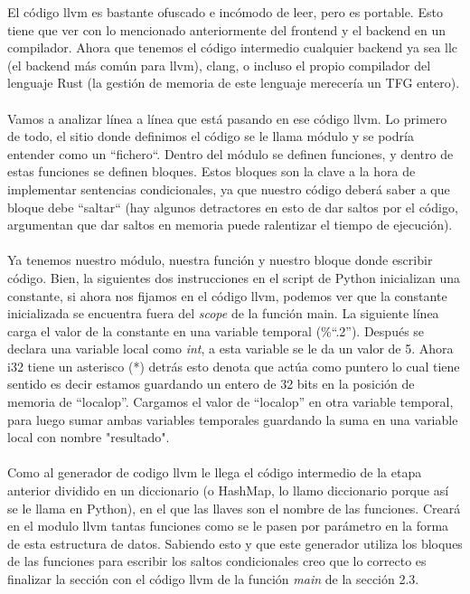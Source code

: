 El código llvm es bastante ofuscado e incómodo de leer, pero es portable. Esto tiene que ver con lo mencionado anteriormente del frontend y el backend en un compilador. Ahora que tenemos el código intermedio cualquier backend ya sea llc (el backend más común para llvm), clang, o incluso el propio compilador del lenguaje Rust (la gestión de memoria de este lenguaje merecería un TFG entero).\\\\
Vamos a analizar línea a línea que está pasando en ese código llvm. Lo primero de todo, el sitio donde definimos el código se le llama módulo y se podría entender como un ``fichero``. Dentro del módulo se definen funciones, y dentro de estas funciones se definen bloques. Estos bloques son la clave a la hora de implementar sentencias condicionales, ya que nuestro código deberá saber a que bloque debe ``saltar`` (hay algunos detractores en esto de dar saltos por el código, argumentan que dar saltos en memoria puede ralentizar el tiempo de ejecución).\\\\ Ya tenemos nuestro módulo, nuestra función y nuestro bloque donde escribir código. Bien, la siguientes dos instrucciones en el script de Python inicializan una constante, si ahora nos fijamos en el código llvm, podemos ver que la constante inicializada se encuentra fuera del \textit{scope} de la función main. La siguiente línea carga el valor de la constante en una variable temporal (\%``.2'').  Después se declara una variable local como \textit{int}, a esta variable se le da un valor de 5. Ahora i32 tiene un asterisco (*) detrás esto denota que actúa como puntero lo cual tiene sentido es decir estamos guardando un entero de 32 bits en la posición de memoria de ``localop''. Cargamos el valor de ``localop'' en otra variable temporal, para luego sumar ambas variables temporales guardando la suma en una variable local con nombre "resultado".
\\\\
Como al generador de codigo llvm le llega el código intermedio de la etapa anterior dividido en un diccionario (o HashMap, lo llamo diccionario porque así se le llama en Python), en el que las llaves son el nombre de las funciones. Creará en el modulo llvm tantas funciones como se le pasen por parámetro en la forma de esta estructura de datos. Sabiendo esto y que este generador utiliza los bloques de las funciones para escribir los saltos condicionales creo que lo correcto es finalizar la sección con el código llvm de la función \textit{main} de la sección 2.3.
